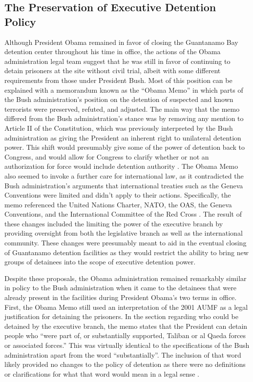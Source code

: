 \documentclass[12pt]{article}
\begin{document}
\subsection*{The Preservation of Executive Detention Policy}
Although President Obama remained in favor of closing the Guantanamo Bay detention center throughout his time in office, the actions of the Obama administration legal team suggest that he was still in favor of continuing to detain prisoners at the site without civil trial, albeit with some different requirements from those under President Bush.
Most of this position can be explained with a memorandum known as the ``Obama Memo'' in which parts of the Bush administration's position on the detention of suspected and known terrorists were preserved, refuted, and adjusted.
The main way that the memo differed from the Bush administration's stance was by removing any mention to Article II of the Constitution, which was previously interpreted by the Bush administration as giving the President an inherent right to unilateral detention power.
This shift would presumably give some of the power of detention back to Congress, and would allow for Congress to clarify whether or not an authorization for force would include detention authority \autocite[44]{brill2010}.
The Obama Memo also seemed to invoke a further care for international law, as it contradicted the Bush administration's arguments that international treaties such as the Geneva Conventions were limited and didn't apply to their actions.
Specifically, the memo referenced the United Nations Charter, NATO, the OAS, the Geneva Conventions, and the International Committee of the Red Cross \autocite[46]{brill2010}.
The result of these changes included the limiting the power of the executive branch by providing oversight from both the legislative branch as well as the international community.
These changes were presumably meant to aid in the eventual closing of Guantanamo detention facilities as they would restrict the ability to bring new groups of detainees into the scope of executive detention power.

Despite these proposals, the Obama administration remained remarkably similar in policy to the Bush administration when it came to the detainees that were already present in the facilities during President Obama's two terms in office.
First, the Obama Memo still used an interpretation of the 2001 AUMF as a legal justification for detaining the prisoners.
In the section regarding who could be detained by the executive branch, the memo states that the President can detain people who ``were part of, or substantially supported, Taliban or al Qaeda forces or associated forces.''
This was virtually identical to the specifications of the Bush administration apart from the word ``substantially''.
The inclusion of that word likely provided no changes to the policy of detention as there were no definitions or clarifications for what that word would mean in a legal sense \autocite[46]{brill2010}.
\end{document}
